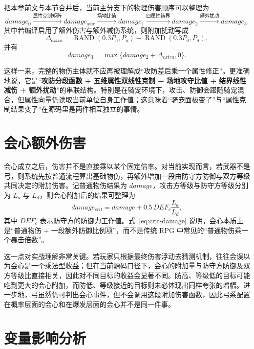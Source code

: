 把本章前文与本节合并后，当前主分支下的物理伤害顺序可以整理为
\begin{equation}
    damage_0
    \xrightarrow{\text{属性克制矩阵}}
    damage_{\mathrm{attr}}
    \xrightarrow{\text{场地比值}}
    damage_1
    \xrightarrow{\text{四属性结界}}
    damage_2
    \xrightarrow{\text{额外扰动}}
    damage_3.
\end{equation}
其中若编译启用了额外伤害与额外减伤系统，则附加扰动写成
\begin{equation}
    \Delta_{extra} = \operatorname{RAND}(0.3P_a,P_a)-\operatorname{RAND}(0.3P_d,P_d),
\end{equation}
并有
\begin{equation}
    damage_3 = \max\{damage_2 + \Delta_{extra},0\}.
\end{equation}

这样一来，完整的物伤主体就不应再被理解成“攻防差后乘一个属性修正”。更准确地说，它是“\textbf{攻防分段函数 + 五维属性双线性克制 + 场地攻守比值 + 结界线性减伤 + 额外扰动}”的串联结构。特别是在骑宠环境下，攻击、防御会跟随骑宠混合，但属性向量仍读取当前单位自身工作值；这意味着“骑宠面板变了”与“属性克制结果变了”在源码里是两件相互独立的事情。

\section{会心额外伤害}

会心成立之后，伤害并不是直接乘以某个固定倍率。对当前实现而言，若武器不是弓，则系统先按普通流程算出基础物伤，再额外增加一段由防守方防御与双方等级共同决定的附加伤害。记普通物伤结果为 $damage$，攻击方等级与防守方等级分别为 $L_a$ 与 $L_d$，则会心附加后的结果可整理为
\begin{equation}
    damage_{crit} = damage + 0.5\,DEF_c\frac{L_a}{L_d},
    \label{eq:crit-damage}
\end{equation}
其中 $DEF_c$ 表示防守方的防御力工作值。式~\eqref{eq:crit-damage} 说明，会心本质上是“普通物伤 + 一段额外防御比例项”，而不是传统 RPG 中常见的“普通物伤乘一个暴击倍数”。

这一点对实战理解非常关键。若玩家只根据最终伤害浮动去猜测机制，往往会误以为会心是一个乘法型收益；但在当前源码口径下，会心的附加量与防守方防御及双方等级比直接相关，因此对不同目标的收益会显著不同。防高、等级低的目标可能吃到更大的会心附加，而防低、等级接近的目标则未必体现出同样夸张的增幅。进一步地，弓虽然仍可判出会心事件，但不会调用这段附加伤害函数，因此弓系配置在概率层面的会心和在爆发层面的会心并不是同一件事。

\section{变量影响分析}


